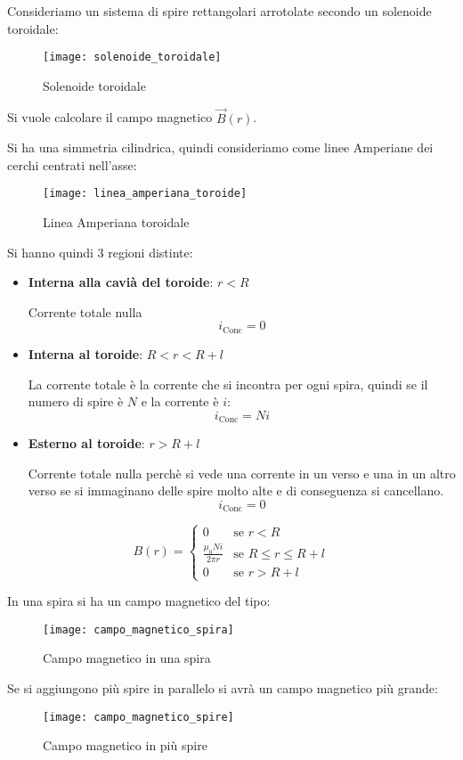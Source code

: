 \documentclass[a4paper]{article}
\begin{document}
\begin{example}
  Consideriamo un sistema di spire rettangolari arrotolate secondo un solenoide toroidale:
  \begin{figure}[H]
    \centering
    \texttt{[image: solenoide\_toroidale]}
    \caption{Solenoide toroidale}
  \end{figure}
  \noindent
  Si vuole calcolare il campo magnetico \( \vec{B}(r) \).

  \vspace{1em}
  \noindent
  Si ha una simmetria cilindrica, quindi consideriamo come linee Amperiane dei cerchi
  centrati nell'asse:
  \begin{figure}[H]
    \centering
    \texttt{[image: linea\_amperiana\_toroide]}
    \caption{Linea Amperiana toroidale}
  \end{figure}
  \noindent
  Si hanno quindi 3 regioni distinte:
  \begin{itemize}
    \item \textbf{Interna alla cavià del toroide}: \( r < R \)

      Corrente totale nulla
      \[
        i_{\text{Conc}} = 0
      \] 

    \item \textbf{Interna al toroide}: \( R < r < R + l \) 

      La corrente totale è la corrente che si incontra per ogni spira, quindi se il
      numero di spire è \( N \) e la corrente è \( i \):
      \[
        i_{\text{Conc}} = N i
      \]

    \item \textbf{Esterno al toroide}: \( r > R + l \)
      
      Corrente totale nulla perchè si vede una corrente in un verso e una in un altro
      verso se si immaginano delle spire molto alte e di conseguenza si cancellano.
      \[
        i_{\text{Conc}} = 0
      \]
  \end{itemize}
  \[
    B(r) = \begin{cases}
      0 & \text{se } r < R \\
      \frac{\mu_0 N i}{2 \pi r} & \text{se } R \le r \le R + l \\
      0 & \text{se } r > R + l
    \end{cases}
  \] 

  \vspace{1em}
  \noindent
  In una spira si ha un campo magnetico del tipo:
  \begin{figure}[H]
    \centering
    \texttt{[image: campo\_magnetico\_spira]}
    \caption{Campo magnetico in una spira}
  \end{figure}
  \noindent
  Se si aggiungono più spire in parallelo si avrà un campo magnetico più grande:
  \begin{figure}[H]
    \centering
    \texttt{[image: campo\_magnetico\_spire]}
    \caption{Campo magnetico in più spire}
  \end{figure}


\end{example}
\end{document}
